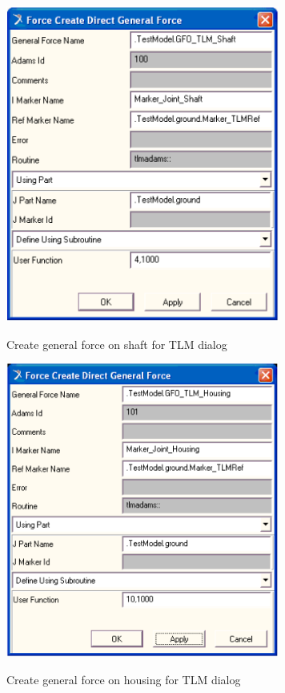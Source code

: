 \begin{figure}[h]
\begin{center}
   {\includegraphics[width=9cm]{figs/TLMGFOShaft.png}}
\end{center}
\caption{Create general force on shaft for TLM dialog \label{figTLMGFOShaft}}
\end{figure}
\begin{figure}
\begin{center}
   {\includegraphics[width=9cm]{figs/TLMGFOHousing.png}}
\end{center}
\caption{Create general force on housing for TLM dialog \label{figTLMGFOHousing}}
\end{figure}

